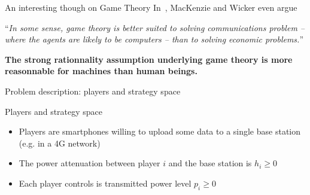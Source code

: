 \begin{frame}{An interesting though on Game Theory}
    In~\cite{mackenzie01}, MacKenzie and Wicker even argue

    \begin{center}
        ``\textit{In some sense, game theory is better suited to solving communications
        problem -- where the agents are likely to be computers -- than to solving economic
        problems.}''
    \end{center}
    
    \vspace{0.5cm}
    \textbf{{\color{green}The strong rationnality assumption underlying game theory is more
    reasonnable for machines than human beings.}}
\end{frame}


\begin{frame}{Problem description: players and strategy space}
    \begin{exampleblock}{Players and strategy space}
        \begin{itemize}
            \pause
            \item Players are smartphones willing to upload some data to a single base station (e.g. in
            a 4G network)
            \pause
            \item The power attenuation between player $i$ and the base station is $h_i \ge 0$
            \pause
            \item Each player controls is transmitted power level $p_i \ge 0$
        \end{itemize}
    \end{exampleblock}
\end{frame}


